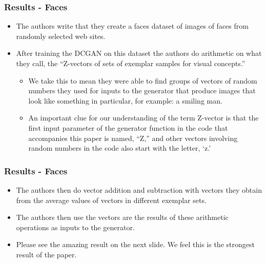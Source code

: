 \documentclass{beamer}
\begin{document}

\begin{frame}[allowframebreaks]
\frametitle{Results - Faces}
\begin{itemize}
\item The authors write that they create a faces dataset of images of faces from
  randomly selected web sites.

\item After training the DCGAN on this dataset the authors do arithmetic on
what they call, the ``Z-vectors of sets of exemplar samples for visual concepts.''

\begin{itemize}
  \item We take this to mean they were able to find groups of vectors of random
  numbers they used for inputs to the generator that produce images that look like
  something in particular, for example: a smiling man.

  \item An important clue for our understanding of the term Z-vector is that the
  first input parameter of the generator function in the code that accompanies this
  paper \cite{dcganCode} is named, ``Z,'' and other vectors involving random numbers
  in the code also start with the letter, `z.'
  \end{itemize}

\end{itemize}
\end{frame}


\begin{frame}[allowframebreaks]
\frametitle{Results - Faces}
\begin{itemize}
\item The authors then do vector addition and subtraction with vectors they obtain
from the average values of vectors in different exemplar sets.

\item The authors then use the vectors are the results of these arithmetic operations
as inputs to the generator.

\item Please see the amazing result on the next slide. We feel this is the strongest
result of the paper. 
\end{itemize}
\end{frame}

\end{document}
